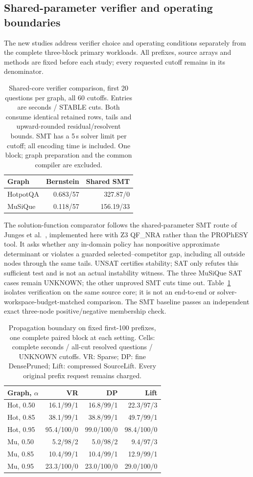 \subsection{Shared-parameter verifier and operating boundaries}
The new studies address verifier choice and operating conditions separately from the complete three-block primary workloads. All prefixes, source arrays and methods are fixed before each study; every requested cutoff remains in its denominator.
\begin{table}[t]\centering\footnotesize\setlength{\tabcolsep}{3pt}
\caption{Shared-core verifier comparison, first 20 questions per graph, all 60 cutoffs. Entries are seconds / STABLE cuts. Both consume identical retained rows, tails and upward-rounded residual/resolvent bounds. SMT has a 5\,s solver limit per cutoff; all encoding time is included. One block; graph preparation and the common compiler are excluded.}
\label{tab:shared-smt}
\begin{tabular}{lrr}\toprule Graph & Bernstein & Shared SMT\\\midrule
HotpotQA & 0.683/57 & 327.87/0\\
MuSiQue & 0.118/57 & 156.19/33\\
\bottomrule\end{tabular}\end{table}
The solution-function comparator follows the shared-parameter SMT route of Junges et al.~\cite{junges2024}, implemented here with Z3 QF\_NRA rather than the PROPhESY tool. It asks whether any in-domain policy has nonpositive approximate determinant or violates a guarded selected--competitor gap, including all outside nodes through the same tails. UNSAT certifies stability; SAT only refutes this sufficient test and is not an actual instability witness. The three MuSiQue SAT cases remain UNKNOWN; the other unproved SMT cuts time out. Table~\ref{tab:shared-smt} isolates verification on the same source core; it is not an end-to-end or solver-workspace-budget-matched comparison. The SMT baseline passes an independent exact three-node positive/negative membership check.

\begin{table}[t]\centering\footnotesize\setlength{\tabcolsep}{2pt}
\caption{Propagation boundary on fixed first-100 prefixes, one complete paired block at each setting. Cells: complete seconds / all-cut resolved questions / UNKNOWN cutoffs. VR: Sparse; DP: fine DensePruned; Lift: compressed SourceLift. Every original prefix request remains charged.}
\label{tab:alpha-boundary}
\begin{tabular}{lrrr}\toprule Graph, $\alpha$ & VR & DP & Lift\\\midrule
Hot, 0.50 & 16.1/99/1 & 16.8/99/1 & 22.3/97/3\\
Hot, 0.85 & 38.1/99/1 & 38.8/99/1 & 49.7/99/1\\
Hot, 0.95 & 95.4/100/0 & 99.0/100/0 & 98.4/100/0\\
Mu, 0.50 & 5.2/98/2 & 5.0/98/2 & 9.4/97/3\\
Mu, 0.85 & 10.4/99/1 & 10.4/99/1 & 12.9/99/1\\
Mu, 0.95 & 23.3/100/0 & 23.0/100/0 & 29.0/100/0\\
\bottomrule\end{tabular}\end{table}
